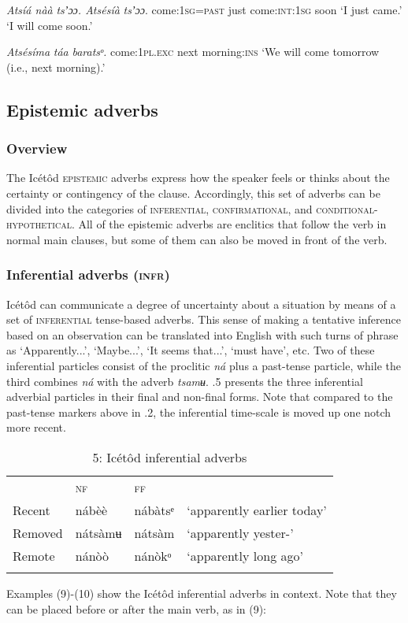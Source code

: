 \textit{Atsíá nàà}     \textit{tsʼɔɔ}\textit{.    Atsésíà}     \textit{tsʼɔɔ}.
come:\textsc{1sg=past}   just    come:\textsc{int:1sg}   soon
‘I just came.’      ‘I will come soon.’




\textit{Atsésíma}     \textit{táa}\textit{   baratsᵒ.}
come:\textsc{1pl.exc}   next   morning:\textsc{ins}
‘We will come tomorrow (i.e., next morning).’






\subsection{Epistemic adverbs}
\subsubsection{Overview}

The Icétôd \textsc{epistemic} adverbs express how the speaker feels or thinks about the certainty or contingency of the clause. Accordingly, this set of adverbs can be divided into the categories of \textsc{inferential}, \textsc{confirmational}, and \textsc{conditional-hypothetical}. All of the epistemic adverbs are enclitics that follow the verb in normal main clauses, but some of them can also be moved in front of the verb.


\subsubsection{Inferential adverbs (\textsc{infr})}

Icétôd can communicate a degree of uncertainty about a situation by means of a set of \textsc{inferential} tense-based adverbs. This sense of making a tentative inference based on an observation can be translated into English with such turns of phrase as ‘Apparently...’, ‘Maybe...’, ‘It seems that...’, ‘must have’, etc. Two of these inferential particles consist of the proclitic \textit{ná} plus a past-tense particle, while the third combines \textit{ná} with the adverb \textit{tsamʉ}. .5 presents the three inferential adverbial particles in their final and non-final forms. Note that compared to the past-tense markers above in .2, the inferential time-scale is moved up one notch more recent. 


\begin{table}
\caption{5: Icétôd inferential adverbs}
\label{tab:9}


\begin{tabularx}{\textwidth}{XXXX} & \textsc{nf} & \textsc{ff} & \\
\lsptoprule
Recent & nábèè & nábàtsᵉ & ‘apparently earlier today’\\
Removed & nátsàmʉ & nátsàm & ‘apparently yester-’\\
Remote & nánòò & nánòkᵒ & ‘apparently long ago’\\
\lspbottomrule
\end{tabularx}
\end{table}
Examples (9)-(10) show the Icétôd inferential adverbs in context. Note that they can be placed before or after the main verb, as in (9):




